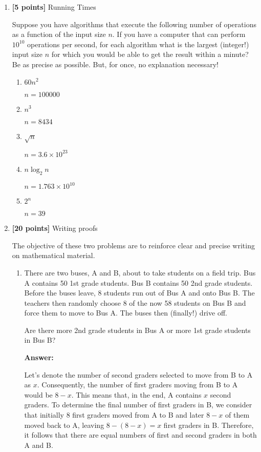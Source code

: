 \documentclass[11pt]{article}
\begin{document}
\begin{enumerate}
\vspace*{.4cm}

\item \textbf{[5 points]} Running Times 

Suppose you have algorithms that execute the following number of
operations as a function of the input size $n$.  If you have a
computer that can perform $10^{10}$ operations per second, for each
algorithm what is the largest (integer!) input size $n$ for which you
would be able to get the result within a minute?  Be as precise as
possible.  But, for once, no explanation necessary!
\begin{enumerate}
\item $60n^2$ 

    $n=100000$
\item $n^3$

    $n=8434$

\item $\sqrt{n}$

    $n=3.6 \times 10^{23}$
\item $n\log_2 n$

    $n=1.763\times 10^{10}$
    
\item $2^n$

    $n = 39$

\end{enumerate}

\vspace*{.5cm}

\item \textbf{[20 points]} Writing proofs

  The objective of these two problems are to reinforce clear and precise
writing on mathematical material.

\begin{enumerate}
\item
There are two buses, A and B, about to take students on a field trip.
Bus A contains 50 1st grade students.  Bus B contains 50 2nd grade
students.  Before the buses leave, 8 students run out of Bus A and
onto Bus B.  The teachers then randomly choose 8 of the now 58
students on Bus B and force them to move to Bus A.  The buses then
(finally!) drive off.

Are there more 2nd grade students in Bus A or more 1st grade students
in Bus B?

\textbf{Answer:}

Let's denote the number of second graders selected to move from B to A as $x$. Consequently, the number of first graders moving from B to A would be $8-x$. This means that, in the end, A contains $x$ second graders. To determine the final number of first graders in B, we consider that initially 8 first graders moved from A to B and later $8-x$ of them moved back to A, leaving $8 - (8-x) = x$ first graders in B. Therefore, it follows that there are equal numbers of first and second graders in both A and B.



\end{enumerate}
\end{enumerate}
\end{document}
